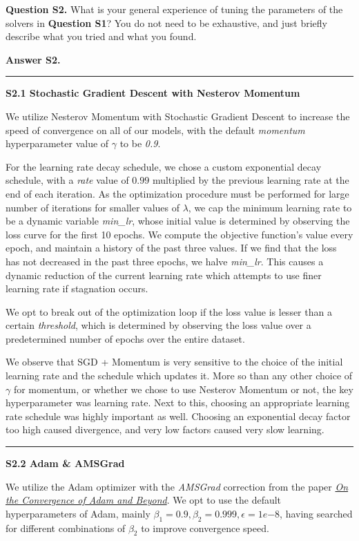 \documentclass[11pt]{report}
\begin{document}
{\bf Question S2.}
What is your general experience of tuning the parameters of the solvers in {\bf Question S1}?
You do not need to be exhaustive, and just briefly describe what you tried and what you found.

{\bf Answer S2.}
%

\rule{\paperwidth}{0.6pt}
{\bf S2.1 Stochastic Gradient Descent with Nesterov Momentum}

We utilize Nesterov Momentum with Stochastic Gradient Descent to increase the speed of convergence on all of our models, with the default \textit{momentum} hyperparameter value of $\gamma$ to be \textit{0.9}. 

For the learning rate decay schedule, we chose a custom exponential decay schedule, with a \textit{rate} value of $0.99$ multiplied by the previous learning rate at the end of each iteration. As the optimization procedure must be performed for large number of iterations for smaller values of $\lambda$, we cap the minimum learning rate to be a dynamic variable \textit{min\_lr}, whose initial value is determined by observing the loss curve for the first 10 epochs. We compute the objective function's value every epoch, and maintain a history of the past three values. If we find that the loss has not decreased in the past three epochs, we halve \textit{min\_lr}. This causes a dynamic reduction of the current learning rate which attempts to use finer learning rate if stagnation occurs. 

We opt to break out of the optimization loop if the loss value is lesser than a certain \textit{threshold}, which is determined by observing the loss value over a predetermined number of epochs over the entire dataset.

We observe that SGD + Momentum is very sensitive to the choice of the initial learning rate and the schedule which updates it. More so than any other choice of $\gamma$ for momentum, or whether we chose to use Nesterov Momentum or not, the key hyperparameter was learning rate. Next to this, choosing an appropriate learning rate schedule was highly important as well. Choosing an exponential decay factor too high caused divergence, and very low factors caused very slow learning.

\rule{\paperwidth}{0.6pt}
{\bf S2.2 Adam \& AMSGrad}

We utilize the Adam optimizer with the \textit{AMSGrad} correction from the paper \href{https://openreview.net/forum?id=ryQu7f-RZ}{\textit{On the Convergence of Adam and Beyond}}. We opt to use the default hyperparameters of Adam, mainly $\beta_1 = 0.9, \beta_2 = 0.999, \epsilon = 1e{-8}$, having searched for different combinations of $\beta_2$ to improve convergence speed.
\end{document}
